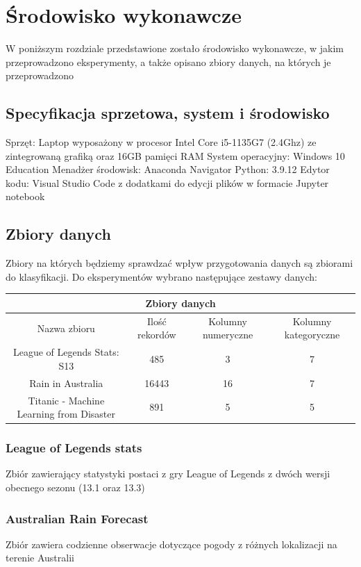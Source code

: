 \documentclass{book}
\begin{document}
\chapter{Środowisko wykonawcze}

W poniższym rozdziale przedstawione zostało środowisko wykonawcze, 
w jakim przeprowadzono eksperymenty, a także opisano zbiory danych, 
na których je przeprowadzono
\section{Specyfikacja sprzetowa, system i środowisko}
Sprzęt: Laptop wyposażony w procesor Intel Core i5-1135G7 
(2.4Ghz) ze zintegrowaną grafiką oraz 16GB pamięci RAM
System operacyjny: Windows 10 Education
Menadżer środowisk: Anaconda Navigator
Python: 3.9.12
Edytor kodu: Visual Studio Code z dodatkami do edycji plików w 
formacie Jupyter notebook
\section{Zbiory danych}
Zbiory na których będziemy sprawdzać wpływ przygotowania danych 
są zbiorami do klasyfikacji. Do eksperymentów wybrano następujące 
zestawy danych:

\begin{center}
    \begin{tabular}{ |c|c|c|c| } 
    \hline
    \multicolumn{4}{|c|}{Zbiory danych} \\
    \hline
    Nazwa zbioru & Ilość rekordów & Kolumny numeryczne & Kolumny kategoryczne \\
     \hline
     League of Legends Stats: S13 & 485 & 3 & 7\\ 
     Rain in Australia & 16443 & 16 & 7\\ 
     Titanic - Machine Learning from Disaster & 891 & 5 & 5\\ 
     \hline
    \end{tabular}
    \end{center}
\subsection{League of Legends stats}
Zbiór zawierający statystyki postaci z gry League of Legends z 
dwóch wersji obecnego sezonu (13.1 oraz 13.3)
\subsection{Australian Rain Forecast}
Zbiór zawiera codzienne obserwacje dotyczące pogody z różnych 
lokalizacji na terenie Australii
\end{document}

